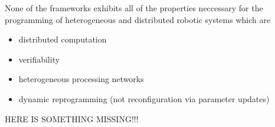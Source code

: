 \documentclass[a4paper,twocolumn]{esapub2005} %
\begin{document}
None of the frameworks exhibits all of the properties neccessary for the programming of heterogeneous and distributed robotic systems which are
\begin{itemize}
    \item distributed computation
    \item verifiability
    \item heterogeneous processing networks
    \item dynamic reprogramming (not reconfiguration via parameter updates)
\end{itemize}

HERE IS SOMETHING MISSING!!!

\end{document}
